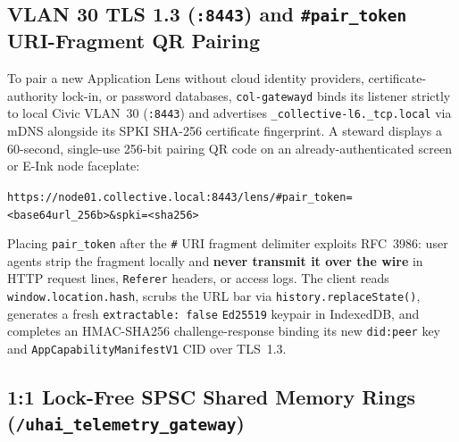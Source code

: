 \subsection{VLAN 30 TLS 1.3 (\texttt{:8443}) and \texttt{\#pair\_token} URI-Fragment QR Pairing}

To pair a new Application Lens without cloud identity providers, certificate-authority lock-in,
or password databases, \texttt{col-gatewayd} binds its listener strictly to local Civic
VLAN~30 (\texttt{:8443}) and advertises \texttt{\_collective-l6.\_tcp.local} via mDNS alongside
its SPKI SHA-256 certificate fingerprint. A steward displays a 60-second, single-use 256-bit
pairing QR code on an already-authenticated screen or E-Ink node faceplate:
\begin{center}
\small\texttt{https://node01.collective.local:8443/lens/\#pair\_token=<base64url\_256b>\&spki=<sha256>}
\end{center}
Placing \texttt{pair\_token} after the \texttt{\#} URI fragment delimiter exploits RFC~3986:
user agents strip the fragment locally and \textbf{never transmit it over the wire} in HTTP
request lines, \texttt{Referer} headers, or access logs. The client reads
\texttt{window.location.hash}, scrubs the URL bar via \texttt{history.replaceState()}, generates
a fresh \texttt{extractable: false} \texttt{Ed25519} keypair in IndexedDB, and completes an
HMAC-SHA256 challenge-response binding its new \texttt{did:peer} key and
\texttt{AppCapabilityManifestV1} CID over TLS~1.3.

\subsection{1:1 Lock-Free SPSC Shared Memory Rings (\texttt{/uhai\_telemetry\_gateway})}

